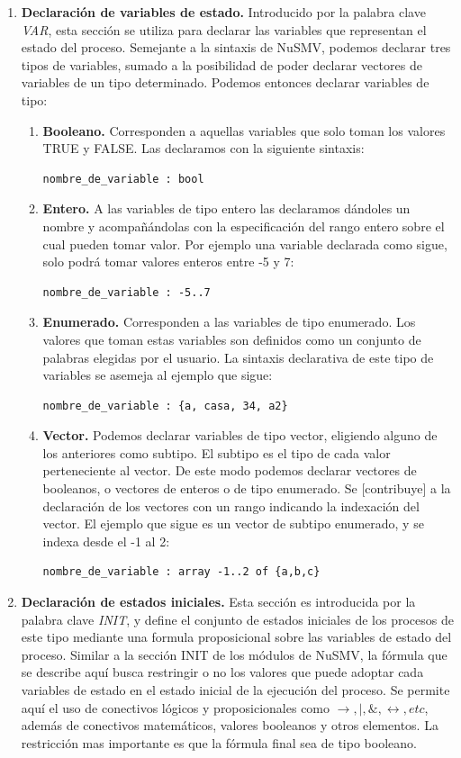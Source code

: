\documentclass[titlepage, 12pt]{book}
\begin{document}
\begin{enumerate}
\item \textbf{Declaraci\'on de variables de estado.} Introducido por la palabra clave \textit{VAR}, esta secci\'on se utiliza para declarar las variables que representan el estado del proceso. Semejante a la sintaxis de NuSMV, podemos declarar tres tipos de variables, sumado a la posibilidad de poder declarar vectores de variables de un tipo determinado. Podemos entonces declarar variables de tipo:
\begin{enumerate}
\item \textbf{Booleano.} Corresponden a aquellas variables que solo toman los valores TRUE y FALSE. Las declaramos con la siguiente sintaxis: \begin{verbatim}nombre_de_variable : bool\end{verbatim}
\item \textbf{Entero.} A las variables de tipo entero las declaramos d\'andoles un nombre y acompa\~n\'andolas con la especificaci\'on del rango entero sobre el cual pueden tomar valor. Por ejemplo una variable declarada como sigue, solo podr\'a tomar valores enteros entre -5 y 7: \begin{verbatim}nombre_de_variable : -5..7\end{verbatim}
\item \textbf{Enumerado.} Corresponden a las variables de tipo enumerado. Los valores que toman estas variables son definidos como un conjunto de palabras elegidas por el usuario. La sintaxis declarativa de este tipo de variables se asemeja al ejemplo que sigue: \begin{verbatim}nombre_de_variable : {a, casa, 34, a2}\end{verbatim}
\item \textbf{Vector.} Podemos declarar variables de tipo vector, eligiendo alguno de los anteriores como subtipo. El subtipo es el tipo de cada valor perteneciente al vector. De este modo podemos declarar vectores de booleanos, o vectores de enteros o de tipo enumerado. Se [contribuye] a la declaraci\'on de los vectores con un rango indicando la indexaci\'on del vector. El ejemplo que sigue es un vector de subtipo enumerado, y se indexa desde el -1 al 2: \begin{verbatim}nombre_de_variable : array -1..2 of {a,b,c}\end{verbatim}
\end{enumerate}
\item \textbf{Declaraci\'on de estados iniciales.}
Esta secci\'on es introducida por la palabra clave \textit{INIT}, y define el conjunto de estados iniciales de los procesos de este tipo mediante una formula proposicional sobre las variables de estado del proceso. Similar a la secci\'on INIT de los m\'odulos de NuSMV, la f\'ormula que se describe aqu\'i busca restringir o no los valores que puede adoptar cada variables de estado en el estado inicial de la ejecuci\'on del proceso. Se permite aqu\'i el uso de conectivos l\'ogicos y proposicionales como $\rightarrow, |, \&, \leftrightarrow, etc$, adem\'as de conectivos matem\'aticos, valores booleanos y otros elementos. La restricci\'on mas importante es que la f\'ormula final sea de tipo booleano.

\end{enumerate}
\end{document}
